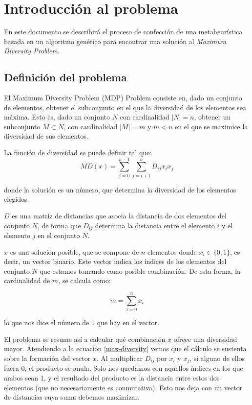     \chapter{Introducción al problema}

En este documento se describirá el proceso de confección de una metaheurística basada en un algoritmo genético para encontrar una solución al \textit{Maximum Diversity Problem}.

\section{Definición del problema}
El Maximum Diversity Problem (MDP) Problem consiste en, dado un conjunto de elementos, obtener el subconjunto en el que la diversidad de los elementos sea máxima. Esto es, dado un conjunto $N$ con cardinalidad $|N| = n$, obtener un subconjunto $M \subset N$, con cardinalidad $|M| = m$ y $m < n$ en el que se maximice la diversidad de sus elementos.

La función de diversidad se puede definir tal que:
\begin{equation}
    MD(x) = \sum^{n-1}_{i=0} \sum^{n}_{j=i+1} D_{ij}x_ix_j
\label{max-diversity}
\end{equation}

donde la solución es un número, que determina la diversidad de los elementos elegidos.

$D$ es una matriz de distancias que asocia la distancia de dos elementos del conjunto $N$, de forma que $D_{ij}$ determina la distancia entre el elemento $i$ y el elemento $j$ en el conjunto $N$.

$x$ es una solución posible, que se compone de $n$ elementos donde $x_i \in \{0, 1\}$, es decir, un vector binario. Este vector indica los índices de los elementos del conjunto $N$ que estamos tomando como posible combinación. De esta forma, la cardinalidad de $m$, se calcula como: 

\begin{equation}
    m = \sum_{i=0}^n x_i 
    \label{eq:sum_m}
\end{equation}

lo que nos dice el número de 1 que hay en el vector.

El problema se resume así a calcular qué combinación $x$ ofrece una diversidad mayor. Atendiendo a la ecuación \ref{max-diversity} vemos que el cálculo se sustenta sobre la formación del vector $x$. Al multiplicar $D_{ij}$ por $x_i$ y $x_j$, si alguno de ellos fuera 0, el producto se anula. Solo nos quedamos con aquellos índices en los que ambos sean 1, y el resultado del producto es la distancia entre estos dos elementos (que no necesariamente es conmutativa). Esto nos deja con un vector de distancias cuya suma debemos maximizar.


